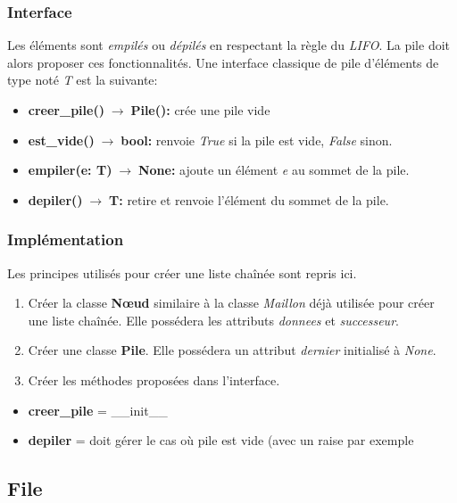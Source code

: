 \documentclass[a4paper,11pt]{article}
\begin{document}
\begin{Form}
\subsubsection{Interface}
Les éléments sont \emph{empilés} ou \emph{dépilés} en respectant la règle du \emph{LIFO}. La pile doit alors proposer ces fonctionnalités. Une interface classique de pile  d'éléments de type noté \emph{T} est la suivante:
\begin{itemize}
\item \textbf{creer\_pile()$\;\rightarrow\;$Pile():} crée une pile vide
\item \textbf{est\_vide()$\;\rightarrow\;$bool:} renvoie \emph{True} si la pile est vide, \emph{False} sinon.
\item \textbf{empiler(e: T)$\;\rightarrow\;$None:} ajoute un élément \emph{e} au sommet de la pile.
\item \textbf{depiler()$\;\rightarrow\;$T:} retire et renvoie l'élément du sommet de la pile.
\end{itemize}
\subsubsection{Implémentation}
Les principes utilisés pour créer une liste chaînée sont repris ici.
\begin{activite}
\begin{enumerate}
\item Créer la classe \textbf{Nœud} similaire à la classe \emph{Maillon} déjà utilisée pour créer une liste chaînée. Elle possédera les attributs \emph{donnees} et \emph{successeur}.
\item Créer une classe \textbf{Pile}. Elle possédera un attribut \emph{dernier} initialisé à \emph{None}.
\item Créer les méthodes proposées dans l'interface.
\end{enumerate}
\end{activite}
\begin{commentprof}
\begin{itemize}
\item \textbf{creer\_pile} = \_\_init\_\_
\item \textbf{depiler} = doit gérer le cas où pile est vide (avec un raise par exemple
\end{itemize}
\end{commentprof}
\subsection{File}

\end{Form}
\end{document}
